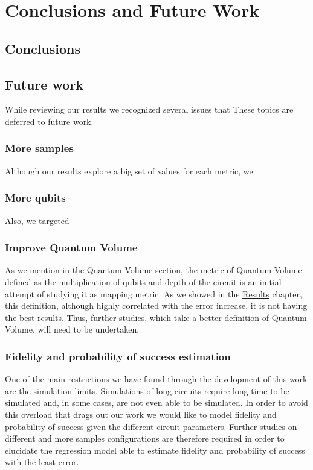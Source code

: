 

\chapter{Conclusions and Future Work}
\label{sec:org3d18185}
\section{Conclusions}
\label{sec:org47e21c4}
\section{Future work}
\label{sec:org6667f25}

While reviewing our results we recognized several issues that
These topics are deferred to future work.

\subsection{More samples}
\label{sec:orgf9d20fa}

Although our results explore a big set of values for each metric, we 


\subsection{More qubits}
\label{sec:org0310707}

Also, we targeted 

\subsection{Improve Quantum Volume}
\label{sec:orgc127c02}

As we mention in the \hyperref[]{Quantum Volume} section, the metric of Quantum Volume defined as the multiplication of qubits and depth of the circuit is an initial attempt of studying it as mapping metric.
As we showed in the \hyperref[]{Results} chapter, this definition, although highly correlated with the error increase, it is not having the best results.
Thus, further studies, which take a better definition of Quantum Volume, will need to be undertaken.

\subsection{Fidelity and probability of success estimation}
\label{sec:orgc5a25c3}

One of the main restrictions we have found through the development of this work are the simulation limits.
Simulations of long circuits require long time to be simulated and, in some cases, are not even able to be simulated.
In order to avoid this overload that drags out our work we would like to model fidelity and probability of success given the different circuit parameters.
Further studies on different and more samples configurations are therefore required in order to elucidate the regression model able to estimate fidelity and probability of success with the least error.

